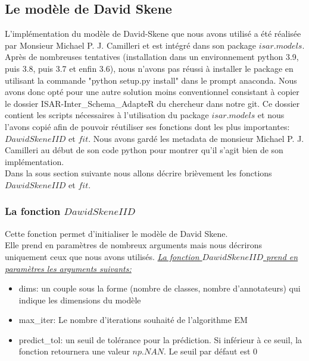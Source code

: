 \documentclass[a4paper,french,10pt]{article}
\begin{document}
	\subsection{Le modèle de David Skene}
	L'implémentation du modèle de David-Skene que nous avons utilisé a été réalisée par Monsieur Michael P. J. Camilleri et est intégré dans son package $isar.models$. Après de nombreuses tentatives (installation dans un environnement python 3.9, puis 3.8, puis 3.7 et enfin 3.6), nous n'avons pas réussi à installer le package en utilisant la commande "python setup.py install" dans le prompt anaconda. Nous avons donc opté pour une autre solution moins conventionnel consistant à copier le dossier ISAR-Inter\_Schema\_AdapteR du chercheur dans notre git. Ce dossier contient les scripts nécessaires à l'utilisation du package $isar.models$ et nous l'avons copié afin de pouvoir réutiliser ses fonctions dont les plus importantes: $DawidSkeneIID$ et $fit$. Nous avons gardé les metadata de monsieur Michael P. J. Camilleri au début de son code python pour montrer qu'il s'agit bien de son implémentation. \\
	Dans la sous section suivante nous allons décrire brièvement les fonctions $DawidSkeneIID$ et $fit$.
	
	\subsubsection{La fonction $DawidSkeneIID$}
	Cette fonction permet d'initialiser le modèle de David Skene. \\
	Elle prend en paramètres de nombreux arguments mais nous décrirons uniquement ceux que nous avons utilisés.
	\vspace{2mm}
	\textit{\underline{La fonction $DawidSkeneIID$ prend en paramètres les arguments suivants:}}
	\vspace{2mm}
	\begin{itemize}
		\item dims: un couple sous la forme (nombre de classes, nombre d'annotateurs) qui indique les dimensions du modèle \\
		\item max\_iter: Le nombre d'iterations souhaité de l'algorithme EM \\
		\item predict\_tol: un seuil de tolérance pour la prédiction. Si inférieur à ce seuil, la fonction retournera une valeur $np.NAN$. Le seuil par défaut est $0$
	\end{itemize}
\end{document}
